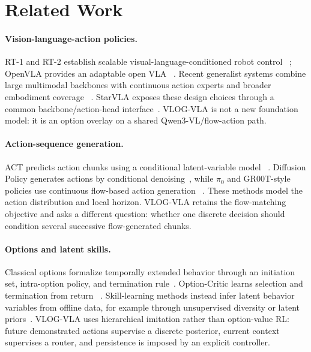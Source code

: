 \section{Related Work}

\paragraph{Vision-language-action policies.}
RT-1 and RT-2 establish scalable visual-language-conditioned robot control
~\citep{brohan2022rt1,brohan2023rt2}; OpenVLA provides an adaptable open VLA
~\citep{kim2024openvla}.  Recent generalist systems combine large multimodal
backbones with continuous action experts and broader embodiment coverage
~\citep{black2024pi0,intelligence2025pi05,bjorck2025groot,shukor2025smolvla}.
StarVLA exposes these design choices through a common backbone/action-head
interface~\citep{community2026starvla}.  VLOG-VLA is not a new foundation
model: it is an option overlay on a shared Qwen3-VL/flow-action path.

\paragraph{Action-sequence generation.}
ACT predicts action chunks using a conditional latent-variable model
~\citep{zhao2023act}.  Diffusion Policy generates actions by conditional
denoising~\citep{chi2023diffusion}, while \(\pi_0\) and GR00T-style policies
use continuous flow-based action generation
~\citep{black2024pi0,bjorck2025groot}.  These methods model the action
distribution and local horizon.  VLOG-VLA retains the flow-matching objective
and asks a different question: whether one discrete decision should condition
several successive flow-generated chunks.

\paragraph{Options and latent skills.}
Classical options formalize temporally extended behavior through an initiation
set, intra-option policy, and termination rule~\citep{sutton1999options}.
Option-Critic learns selection and termination from return
~\citep{bacon2017optioncritic}.  Skill-learning methods instead infer latent
behavior variables from offline data, for example through unsupervised
diversity or latent priors~\citep{eysenbach2019diayn,pertsch2021spirl}.
VLOG-VLA uses hierarchical imitation rather than option-value RL: future
demonstrated actions supervise a discrete posterior, current context supervises
a router, and persistence is imposed by an explicit controller.

